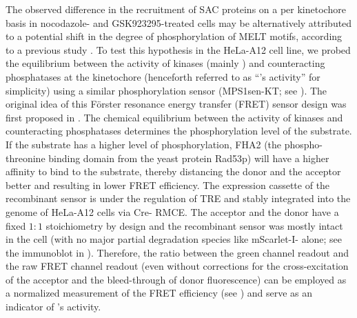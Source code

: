 The observed difference in the recruitment of SAC proteins on a per kinetochore basis in nocodazole- and GSK923295-treated cells may be alternatively attributed to a potential shift in the degree of phosphorylation of MELT motifs, according to a previous study \cite{MPS1senor}. To test this hypothesis in the HeLa-A12 cell line, we probed the equilibrium between the activity of kinases (mainly ) and counteracting phosphatases at the kinetochore (henceforth referred to as ``'s activity'' for simplicity) using a similar phosphorylation sensor (MPS1sen-KT; see ). The original idea of this F{\"{o}}rster resonance energy transfer (FRET) sensor design was first proposed in \cite{FHA2BasedFRETSensorOriginalStudy}. The chemical equilibrium between the activity of kinases and counteracting phosphatases determines the phosphorylation level of the substrate. If the substrate has a higher level of phosphorylation, FHA2 (the phospho-threonine binding domain from the yeast protein Rad53p) will have a higher affinity to bind to the substrate, thereby distancing the donor and the acceptor better and resulting in lower FRET efficiency. The expression cassette of the recombinant sensor is under the regulation of TRE and stably integrated into the genome of HeLa-A12 cells via Cre- RMCE. The acceptor and the donor have a fixed $1 : 1$ stoichiometry by design and the recombinant sensor was mostly intact in the cell (with no major partial degradation species like mScarlet-I- alone; see the immunoblot in ). Therefore, the ratio between the green channel readout and the raw FRET channel readout (even without corrections for the cross-excitation of the acceptor and the bleed-through of donor fluorescence) can be employed as a normalized measurement of the FRET efficiency (see ) and serve as an indicator of 's activity.


